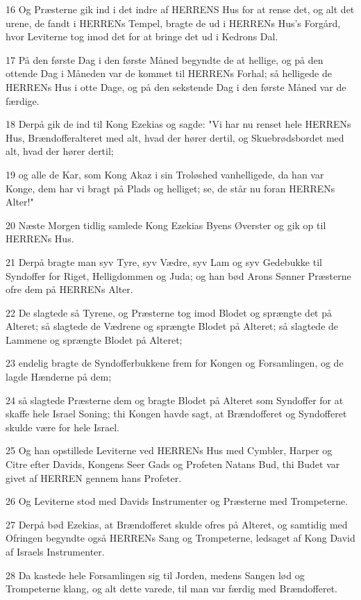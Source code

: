 \par 16 Og Præsterne gik ind i det indre af HERRENS Hus for at rense det, og alt det urene, de fandt i HERRENs Tempel, bragte de ud i HERRENs Hus's Forgård, hvor Leviterne tog imod det for at bringe det ud i Kedrons Dal.
\par 17 På den første Dag i den første Måned begyndte de at hellige, og på den ottende Dag i Måneden var de kommet til HERRENs Forhal; så helligede de HERRENs Hus i otte Dage, og på den sekstende Dag i den første Måned var de færdige.
\par 18 Derpå gik de ind til Kong Ezekias og sagde: "Vi har nu renset hele HERRENs Hus, Brændofferalteret med alt, hvad der hører dertil, og Skuebrødsbordet med alt, hvad der hører dertil;
\par 19 og alle de Kar, som Kong Akaz i sin Troløshed vanhelligede, da han var Konge, dem har vi bragt på Plads og helliget; se, de står nu foran HERRENs Alter!"
\par 20 Næste Morgen tidlig samlede Kong Ezekias Byens Øverster og gik op til HERRENs Hus.
\par 21 Derpå bragte man syv Tyre, syv Vædre, syv Lam og syv Gedebukke til Syndoffer for Riget, Helligdommen og Juda; og han bød Arons Sønner Præsterne ofre dem på HERRENs Alter.
\par 22 De slagtede så Tyrene, og Præsterne tog imod Blodet og sprængte det på Alteret; så slagtede de Vædrene og sprængte Blodet på Alteret; så slagtede de Lammene og sprængte Blodet på Alteret;
\par 23 endelig bragte de Syndofferbukkene frem for Kongen og Forsamlingen, og de lagde Hænderne på dem;
\par 24 så slagtede Præsterne dem og bragte Blodet på Alteret som Syndoffer for at skaffe hele Israel Soning; thi Kongen havde sagt, at Brændofferet og Syndofferet skulde være for hele Israel.
\par 25 Og han opstillede Leviterne ved HERRENs Hus med Cymbler, Harper og Citre efter Davids, Kongens Seer Gads og Profeten Natans Bud, thi Budet var givet af HERREN gennem hans Profeter.
\par 26 Og Leviterne stod med Davids Instrumenter og Præsterne med Trompeterne.
\par 27 Derpå bød Ezekias, at Brændofferet skulde ofres på Alteret, og samtidig med Ofringen begyndte også HERRENs Sang og Trompeterne, ledsaget af Kong David af Israels Instrumenter.
\par 28 Da kastede hele Forsamlingen sig til Jorden, medens Sangen lød og Trompeterne klang, og alt dette varede, til man var færdig med Brændofferet.
